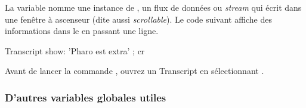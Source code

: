 \documentclass[a4paper,10pt,twoside]{book}
\begin{document}
La variable  nomme une instance de , un flux de données ou \emph{stream} qui écrit dans une fenêtre à ascenseur (dite aussi \emph{scrollable}).
Le code suivant affiche des informations dans le  en passant une ligne.

\begin{code}{}
Transcript show: 'Pharo est extra' ; cr
\end{code} %

\noindent
Avant de lancer la commande , ouvrez un Transcript en 
sélectionnant . %


\subsubsection{D'autres variables globales utiles}
\end{document}

